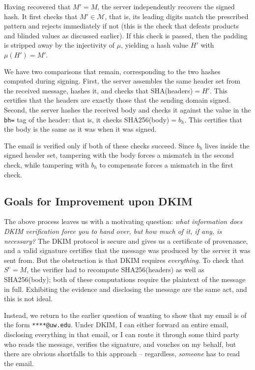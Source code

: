 \documentclass[12pt,reqno]{amsart}
\theoremstyle{definition}
\newcommand{\cM}{\mathcal{M}}
\begin{document}
\begin{enumerate}[label=\arabic*.]
    Having recovered that $M'=M$, the server independently recovers the signed hash. It first checks that $M'\in \cM$, that is, its leading digits match the prescribed pattern and rejects immediately if not (this is the check that defeats products and blinded values as discussed earlier). If this check is passed, then the padding is stripped away by the injectivity of $\mu$, yielding a hash value $H'$ with $\mu(H')=M'$.

    We have two comparisons that remain, corresponding to the two hashes computed during signing. First, the server assembles the same header set from the received message, hashes it, and checks that SHA(headers)$=H'$. This certifies that the headers are exactly those that the sending domain signed. Second, the server hashes the received body and checks it against the value in the \verb|bh=| tag of the header: that is, it checks SHA256(body)$=b_h$. This certifies that the body is the same as it was when it was signed. 

    The email is verified only if both of these checks succeed. Since $b_h$ lives inside the signed header set, tampering with the body forces a mismatch in the second check, while tampering with $b_h$ to compensate forces a mismatch in the first check.
\end{enumerate}


\subsection{Goals for Improvement upon DKIM}


The above process leaves us with a motivating question: \textit{what information does DKIM verification force you to hand over, but how much of it, if any, is necessary?} The DKIM protocol is secure and gives us a certificate of provenance, and a valid signature certifies that the message was produced by the server it was sent from. But the obstruction is that DKIM requires \textit{everything}. To check that $S^e=M$, the verifier had to recompute SHA256(headers) as well as SHA256(body); both of these computations require the plaintext of the message in full. Exhibiting the evidence and disclosing the message are the same act, and this is not ideal.

Instead, we return to the earlier question of wanting to show that my email is of the form \verb|****@uw.edu|. Under DKIM, I can either forward an entire email, disclosing everything in that email, or I can route it through some third party who reads the message, verifies the signature, and vouches on my behalf, but there are obvious shortfalls to this approach -- regardless, \textit{someone} has to read the email.
\end{document}
